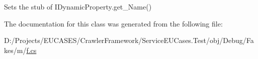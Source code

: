 Sets the stub of I\-Dynamic\-Property.\-get\-\_\-\-Name()



The documentation for this class was generated from the following file\-:\begin{DoxyCompactItemize}
\item 
D\-:/\-Projects/\-E\-U\-C\-A\-S\-E\-S/\-Crawler\-Framework/\-Service\-E\-U\-Cases.\-Test/obj/\-Debug/\-Fakes/m/\hyperlink{m_2f_8cs}{f.\-cs}\end{DoxyCompactItemize}
